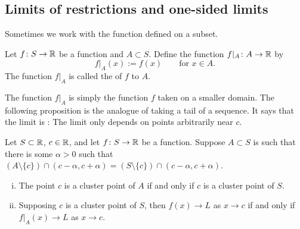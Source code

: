 \subsection{Limits of restrictions and one-sided limits}

Sometimes we work with the function defined on a subset.

\begin{defn}
Let $f \colon S \to {\mathbb{R}}$ be a function and $A \subset S$.  Define the
function $f|_A \colon A \to {\mathbb{R}}$ by
\begin{equation*}
f|_A (x) := f(x)  \qquad \text{for } x \in A.
\end{equation*}
The function
$f|_A$ is called the \emph{} of $f$ to $A$.
\end{defn}

The function $f|_A$ is simply the function $f$ taken on a smaller domain.
The following proposition is the analogue of taking a tail of a sequence.
It says that the limit is : The limit only depends on points
arbitrarily near $c$.

\begin{prop} \label{prop:limrest}
Let $S \subset {\mathbb{R}}$, $c \in {\mathbb{R}}$, and
let $f \colon S
\to {\mathbb{R}}$ be a function.
Suppose
$A \subset S$ is such that there is some $\alpha > 0$ such that
$(A \setminus \{ c \}) \cap (c-\alpha,c+\alpha) = (S \setminus \{ c \}) \cap (c-\alpha,c+\alpha)$.
\begin{enumerate}[(i)]
\item The point $c$ is a cluster point of $A$ if and only if $c$ is a cluster point
of $S$.
\item Supposing $c$ is a cluster point of $S$, then $f(x) \to L$ as $x \to c$ if and only if
$f|_A(x) \to L$ as $x \to c$.
\end{enumerate}
\end{prop}

